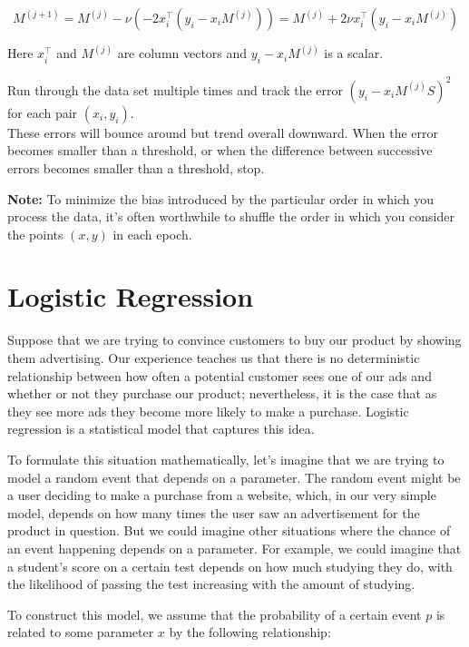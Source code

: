 \documentclass[
  11pt,
  letterpaper,
]{scrbook}
\theoremstyle{plain}
\theoremstyle{remark}
\begin{document}
\[
M^{(j+1)} = M^{(j)}-\nu(-2x_i^{\intercal} (y_i-x_iM^{(j)})) = M^{(j)}+2\nu x_i^{\intercal}(y_i-x_iM^{(j)})
\]

Here \(x_{i}^{\intercal}\) and \(M^{(j)}\) are column vectors and
\(y_i-x_iM^{(j)}\) is a scalar.

Run through the data set multiple times and track the error
\((y_i-x_iM^{(j)}S)^2\) for each pair \((x_i,y_i)\).\\
These errors will bounce around but trend overall downward. When the
error becomes smaller than a threshold, or when the difference between
successive errors becomes smaller than a threshold, stop.

\textbf{Note:} To minimize the bias introduced by the particular order
in which you process the data, it's often worthwhile to shuffle the
order in which you consider the points \((x,y)\) in each epoch.


\hypertarget{logistic-regression}{%
\chapter{Logistic Regression}\label{logistic-regression}}

Suppose that we are trying to convince customers to buy our product by
showing them advertising. Our experience teaches us that there is no
deterministic relationship between how often a potential customer sees
one of our ads and whether or not they purchase our product;
nevertheless, it is the case that as they see more ads they become more
likely to make a purchase. Logistic regression is a statistical model
that captures this idea.

To formulate this situation mathematically, let's imagine that we are
trying to model a random event that depends on a parameter. The random
event might be a user deciding to make a purchase from a website, which,
in our very simple model, depends on how many times the user saw an
advertisement for the product in question. But we could imagine other
situations where the chance of an event happening depends on a
parameter. For example, we could imagine that a student's score on a
certain test depends on how much studying they do, with the likelihood
of passing the test increasing with the amount of studying.

To construct this model, we assume that the probability of a certain
event \(p\) is related to some parameter \(x\) by the following
relationship:
\end{document}
